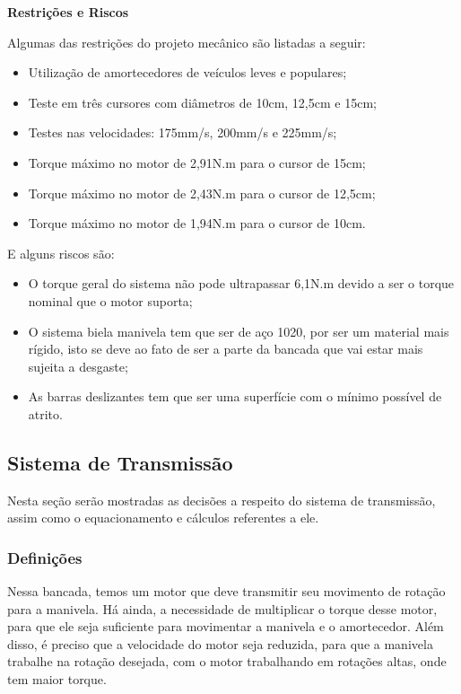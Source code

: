 	\textbf{Restrições e Riscos}

		Algumas das restrições do projeto mecânico são listadas a seguir:

		\begin{itemize}
			\item Utilização de amortecedores de veículos leves e populares;
			\item Teste em três cursores com diâmetros de 10cm, 12,5cm e 15cm;
			\item Testes nas velocidades: 175mm/s, 200mm/s e 225mm/s;
			\item Torque máximo no motor de 2,91N.m para o cursor de 15cm;
			\item Torque máximo no motor de 2,43N.m para o cursor de 12,5cm;
			\item Torque máximo no motor de 1,94N.m para o cursor de 10cm.
		\end{itemize}

		E alguns riscos são:

		\begin{itemize}
			\item O torque geral do sistema não pode ultrapassar 6,1N.m devido a ser o torque nominal que o motor suporta;
			\item O sistema biela manivela tem que ser de aço 1020, por ser um material mais rígido, isto se deve ao fato de ser a parte da bancada que vai estar mais sujeita a desgaste;
			\item As barras deslizantes tem que ser uma superfície com o mínimo possível de atrito. 
		\end{itemize}



\subsection{Sistema de Transmissão}

	Nesta seção serão mostradas as decisões a respeito do sistema de transmissão, assim como o equacionamento e cálculos referentes a ele.

	\subsubsection{Definições}

		Nessa bancada, temos um motor que deve transmitir seu movimento de rotação para a manivela. Há ainda, a necessidade de multiplicar o torque desse motor, para que ele seja suficiente para movimentar a manivela e o amortecedor. Além disso, é preciso que a velocidade do motor seja reduzida, para que a manivela trabalhe na rotação desejada, com o motor trabalhando em rotações altas, onde tem maior torque.

